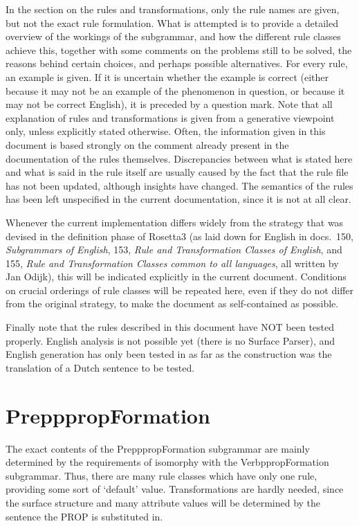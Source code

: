 In the section on the rules and transformations, only the rule names are given, 
but not the exact rule formulation. What is attempted 
is to provide a detailed overview of the workings of the subgrammar, and 
how the different rule classes achieve this,
together with some comments on the problems still to be solved, the reasons 
behind certain choices, and perhaps possible alternatives. For every rule, an 
example is given. If it is uncertain whether the example is correct (either 
because it may not be an example of the phenomenon in question, or because it 
may not be correct English), it is preceded by a question mark. Note that all 
explanation of rules and transformations is given from a generative viewpoint
only, unless explicitly stated otherwise. Often, the information given in this 
document is based strongly on the comment already present in the documentation 
of the rules themselves. Discrepancies between what is stated here and what is 
said in the rule itself are usually caused by the fact that the rule file has 
not  been updated, although insights have changed. The semantics of the rules 
has been left unspecified in the current documentation, since it is not at all 
clear.

Whenever the current implementation differs widely from the strategy that was 
devised in the definition phase of Rosetta3 (as laid down for English in docs.\ 
150, {\em Subgrammars of English\/}, 153, {\em Rule and Transformation Classes 
of English\/}, and 155, {\em Rule and Transformation Classes common to all 
languages\/}, all written by Jan Odijk), this will be indicated explicitly in 
the current document. Conditions on crucial orderings of rule classes will be 
repeated here, even if they do not differ from the original strategy, to make 
the document as self-contained as possible.

Finally note that the rules described in this document have NOT been tested 
properly. English analysis is not possible yet (there is no Surface Parser), and 
English generation has only been tested in as far as the construction was the 
translation of a Dutch sentence to be tested.

\newpage
\section{PrepppropFormation}
The exact contents of the PrepppropFormation subgrammar are mainly determined 
by the requirements of isomorphy with the VerbppropFormation subgrammar. Thus, 
there are many rule classes which have only one rule, providing some sort of 
`default' value. Transformations are hardly needed, since the surface structure 
and many attribute values will be determined by the sentence the PROP is 
substituted in. 

